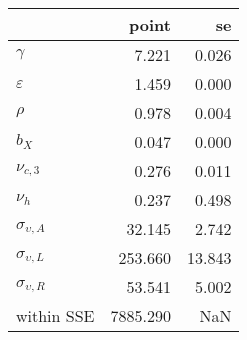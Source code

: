 \begin{tabular}{lrr}
\toprule
{} &     point &      se \\
\midrule
$\gamma$              &     7.221 &   0.026 \\
$\varepsilon$         &     1.459 &   0.000 \\
$\rho$                &     0.978 &   0.004 \\
$b_X$                 &     0.047 &   0.000 \\
$\nu_{c,3}$           &     0.276 &   0.011 \\
$\nu_{h}$             &     0.237 &   0.498 \\
$\sigma_{\upsilon,A}$ &    32.145 &   2.742 \\
$\sigma_{\upsilon,L}$ &   253.660 &  13.843 \\
$\sigma_{\upsilon,R}$ &    53.541 &   5.002 \\
within SSE            &  7885.290 &     NaN \\
\bottomrule
\end{tabular}
